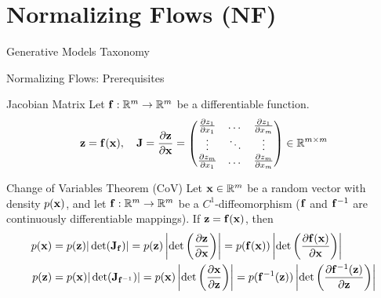 \documentclass{beamer}
\renewcommand{\eqpause}{}
\renewcommand{\nextonslide}[1]{#1}
\begin{document}
\section{Normalizing Flows (NF)}
\begin{frame}{Generative Models Taxonomy}
\end{frame}
\begin{frame}{Normalizing Flows: Prerequisites}
	\begin{block}{Jacobian Matrix}
		Let $\mathbf{f}: \mathbb{R}^m \rightarrow \mathbb{R}^m$ be a differentiable function.
		\[
			\mathbf{z} = \mathbf{f}(\mathbf{x}), \quad 
			\mathbf{J} =  \frac{\partial \mathbf{z}}{\partial \mathbf{x}} =
			\begin{pmatrix}
				\frac{\partial z_1}{\partial x_1} & \dots & \frac{\partial z_1}{\partial x_m} \\
				\vdots & \ddots & \vdots \\ 
				\frac{\partial z_m}{\partial x_1} & \dots & \frac{\partial z_m}{\partial x_m}
			\end{pmatrix} \in \mathbb{R}^{m \times m}
		\]
		\vspace{-0.3cm}
	\end{block}
    \eqpause
	\begin{block}{Change of Variables Theorem (CoV)}
		Let $\mathbf{x}\in \mathbb{R}^m$ be a random vector with density $p(\mathbf{x})$, and let $\mathbf{f}: \mathbb{R}^m \rightarrow \mathbb{R}^m$ be a $C^1$-diffeomorphism ($\mathbf{f}$ and $\mathbf{f}^{-1}$ are continuously differentiable mappings). 
		If $\mathbf{z} = \mathbf{f}(\mathbf{x})$, then
		\begin{align*}
			p(\bx) &= p(\bz) |\det(\bJ_{\bff})| = p(\bz) \left|\det \left( \frac{\partial \bz}{\partial \bx} \right) \right| 
			\nextonslide{= p(\bff(\bx)) \left|\det \left(  \frac{\partial \bff(\bx)}{\partial \bx} \right) \right|} \\
			\nextonslide{p(\bz) &= p(\bx) |\det(\bJ_{\bff^{-1}})| = p(\bx) \left|\det \left(  \frac{\partial \bx}{\partial \bz} \right) \right| 
			= p(\bff^{-1}(\bz)) \left|\det \left(  \frac{\partial \bff^{-1}(\bz)}{\partial \bz} \right) \right| }
		\end{align*}
		\vspace{-0.5cm}
	\end{block}
\end{frame}
\end{document}
